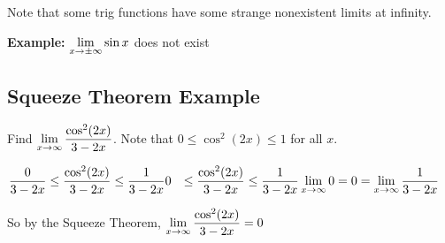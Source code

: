 Note that some trig functions have some strange nonexistent limits at infinity.

\textbf{Example:} $\displaystyle \lim_{x\to\pm\infty} \sin x$ does not exist

\subsection*{Squeeze Theorem Example}

Find $\displaystyle \lim_{x\to\infty}\dfrac{\cos^2(2x)}{3-2x}$.
 Note that $0\leq \cos^2(2x)\leq 1$ for all $x$.

 \begin{align*}
   \dfrac{0}{3-2x} &\leq \dfrac{\cos^2(2x)}{3-2x}\leq\dfrac{1}{3-2x}
   0 &\leq \dfrac{\cos^2(2x)}{3-2x} \leq \dfrac{1}{3-2x}
   \displaystyle \lim_{x\to\infty} 0 &= 0 = \displaystyle \lim_{x\to\infty} \dfrac{1}{3-2x}
 \end{align*}

So by the Squeeze Theorem, $\displaystyle \lim_{x\to\infty} \dfrac{\cos^2(2x)}{3-2x}=0$
